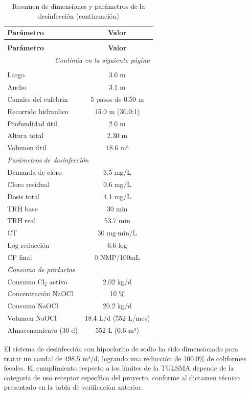 \documentclass[12pt,a4paper]{article}
\begin{document}
\begingroup
\small
\begin{longtable}{@{}lc@{}}
\caption{Resumen de dimensiones y parámetros de la desinfección}\\
\toprule
\textbf{Parámetro} & \textbf{Valor} \\
\midrule
\endfirsthead
\caption[]{Resumen de dimensiones y parámetros de la desinfección (continuación)}\\
\toprule
\textbf{Parámetro} & \textbf{Valor} \\
\midrule
\endhead
\midrule
\multicolumn{2}{r}{\textit{Continúa en la siguiente página}} \\
\endfoot
\bottomrule
\endlastfoot
\multicolumn{2}{l}{\textit{Dimensiones del tanque}} \\
\midrule
Largo & 3.0 m \\
Ancho & 3.1 m \\
Canales del culebrin & 5 pasos de 0.50 m \\
Recorrido hidraulico & 15.0 m (30.0:1) \\
Profundidad útil & 2.0 m \\
Altura total & 2.30 m \\
Volumen útil & 18.6 m³ \\
\midrule
\multicolumn{2}{l}{\textit{Parámetros de desinfección}} \\
\midrule
Demanda de cloro & 3.5 mg/L \\
Cloro residual & 0.6 mg/L \\
Dosis total & 4.1 mg/L \\
TRH base & 30 min \\
TRH real & 53.7 min \\
CT & 30 mg$\cdot$min/L \\
Log reducción & 6.6 log \\
CF final & 0 NMP/100mL \\
\midrule
\multicolumn{2}{l}{\textit{Consumo de productos}} \\
\midrule
Consumo Cl$_2$ activo & 2.02 kg/d \\
Concentración NaOCl & 10 \% \\
Consumo NaOCl & 20.2 kg/d \\
Volumen NaOCl & 18.4 L/d (552 L/mes) \\
Almacenamiento (30 d) & 552 L (0.6 m³) \\
\end{longtable}
\endgroup

El sistema de desinfección con hipoclorito de sodio ha sido dimensionado para tratar un caudal de 498.5 m³/d, logrando una reducción de 100.0\% de coliformes fecales. El cumplimiento respecto a los límites de la TULSMA depende de la categoría de uso receptor específica del proyecto, conforme al dictamen técnico presentado en la tabla de verificación anterior.\
\end{document}
